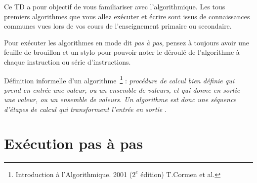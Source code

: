 \documentclass[11pt,a4paper]{article}
\begin{document}
\EncadreTitre

\bigskip


%
%

\bigskip


Ce TD a pour objectif de vous familiariser avec l'algorithmique.
Les tous premiers algorithmes que vous allez exécuter et écrire sont issus de connaissances communes vues lors de vos cours de l'enseignement primaire ou secondaire.

Pour exécuter les algorithmes en mode dit \textit{pas à pas}, pensez à toujours avoir une feuille de brouillon et un stylo pour pouvoir noter le déroulé de l'algorithme à chaque instruction ou série d'instructions.

\bigskip

Définition informelle d'un algorithme~\footnote{Introduction à l'Algorithmique. 2001 ($2^{e}$ édition) T.Cormen et al.} : \og \textit{procédure de calcul bien définie qui prend en entrée une valeur, ou un ensemble de valeurs, et qui donne en sortie une valeur, ou un ensemble de valeurs. Un algorithme est donc une séquence d'étapes de calcul qui transforment l'entrée en sortie} \fg .

\bigskip


\section{Exécution pas à pas}

\bigskip

\end{document}

